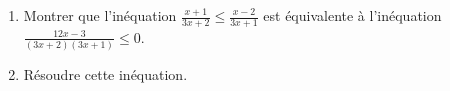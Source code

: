 
\begin{exercice}\label{exosmath-0711}

    \begin{enumerate}
        \item
            
    Montrer que l'inéquation \( \frac{ x+1 }{ 3x+2 }\leq \frac{ x-2 }{ 3x+1 }\) est équivalente à l'inéquation \( \frac{ 12x-3 }{ (3x+2)(3x+1) }\leq 0\).
\item
    Résoudre cette inéquation.
    \end{enumerate}

\end{exercice}
